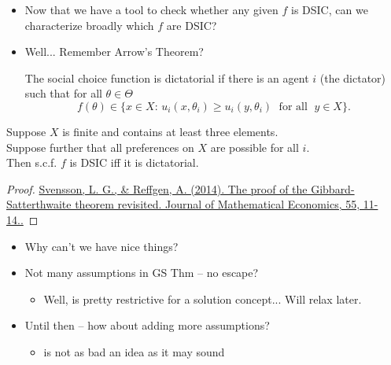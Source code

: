 \documentclass[english]{beamer}		%
\def\lyxframeend{} %
\begin{document}
\begin{itemize}
	\item Now that we have a tool to check whether any given $f$ is DSIC, can we characterize broadly which $f$ are DSIC?
	\pause
	\item Well... Remember Arrow's Theorem?
	\pause
	\begin{definition}[Dictatorial s.c.f.]
		The social choice function is dictatorial if there is an agent $i$ (the dictator) such that for all $\theta\in\Theta$
		$$ f(\theta)\in\{x\in X:\, u_i(x,\theta_i)\geq u_{i}(y,\theta_{i})\;\text{ for all }\;y\in X\}.$$
	\end{definition}
\end{itemize}
\lyxframeend


\begin{theorem}
	Suppose $X$ is finite and contains at least three elements. \\
	Suppose further that all preferences on $X$ are possible for all $i$.\\ 
	Then s.c.f. $f$ is DSIC iff it is dictatorial.
\end{theorem}
\begin{proof}[Proof]
	\href{http://dx.doi.org/10.1016/j.jmateco.2014.09.007}{Svensson, L. G., \& Reffgen, A. (2014). The proof of the Gibbard-Satterthwaite theorem revisited. Journal of Mathematical Economics, 55, 11-14..}
\end{proof}
\lyxframeend


\begin{itemize}
	\item Why can't we have nice things?
	\item Not many assumptions in GS Thm -- no escape?
	\pause
	\begin{itemize}
		\item Well,  is pretty restrictive for a solution concept... Will relax later.
	\end{itemize}
	\item Until then -- how about adding more assumptions?
	\begin{itemize}
		\item {} is not as bad an idea as it may sound
	\end{itemize}
\end{itemize}
\lyxframeend
\end{document}
